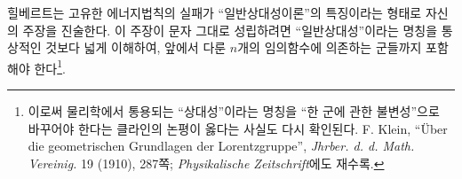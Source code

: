 힐베르트는 고유한 에너지법칙의 실패가 ``일반상대성이론''의 특징이라는 형태로 자신의 주장을 진술한다. 이 주장이 문자 그대로 성립하려면 ``일반상대성''이라는 명칭을 통상적인 것보다 넓게 이해하여, 앞에서 다룬 \(n\)개의 임의함수에 의존하는 군들까지 포함해야 한다\footnote{이로써 물리학에서 통용되는 ``상대성''이라는 명칭을 ``한 군에 관한 불변성''으로 바꾸어야 한다는 클라인의 논평이 옳다는 사실도 다시 확인된다. F. Klein, ``Über die geometrischen Grundlagen der Lorentzgruppe'', \emph{Jhrber. d. d. Math. Vereinig.} 19 (1910), 287쪽; \emph{Physikalische Zeitschrift}에도 재수록.}.
